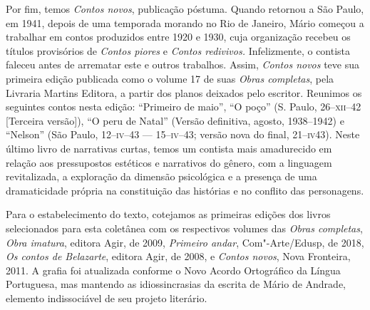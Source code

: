 Por fim, temos \emph{Contos novos}, publicação póstuma. Quando retornou
a São Paulo, em 1941, depois de uma temporada morando no Rio de Janeiro,
Mário começou a trabalhar em contos produzidos entre 1920 e 1930, cuja
organização recebeu os títulos provisórios de \emph{Contos piores} e
\emph{Contos redivivos.} Infelizmente, o contista faleceu antes de
arrematar este e outros trabalhos. Assim, \emph{Contos novos} teve sua
primeira edição publicada como o volume 17 de suas \emph{Obras
completas}, pela Livraria Martins Editora, a partir dos planos deixados
pelo escritor. Reunimos os seguintes contos nesta edição: ``Primeiro de
maio'', ``O poço'' (S. Paulo, 26--\textsc{xii}--42 {[}Terceira versão{]}), ``O peru
de Natal'' (Versão definitiva, agosto, 1938--1942) e ``Nelson'' (São
Paulo, 12--\textsc{iv}--43 --- 15--\textsc{iv}--43; versão nova do final, 21--\textsc{iv}43). %
Neste
último livro de narrativas curtas, temos um contista mais amadurecido em
relação aos pressupostos estéticos e narrativos do gênero, com a
linguagem revitalizada, a exploração da dimensão psicológica e a
presença de uma dramaticidade própria na constituição das histórias e no
conflito das personagens.

Para o estabelecimento do texto, cotejamos as primeiras edições dos
livros selecionados para esta coletânea com os respectivos volumes das
\emph{Obras completas}, \emph{Obra imatura}, editora Agir, de 2009,
\emph{Primeiro andar}, Com"-Arte/Edusp, de 2018, \emph{Os contos de
Belazarte}, editora Agir, de 2008, e \emph{Contos novos}, Nova
Fronteira, 2011. A grafia foi atualizada conforme o Novo Acordo
Ortográfico da Língua Portuguesa, mas mantendo as idiossincrasias da
escrita de Mário de Andrade, elemento indissociável de seu projeto
literário.
